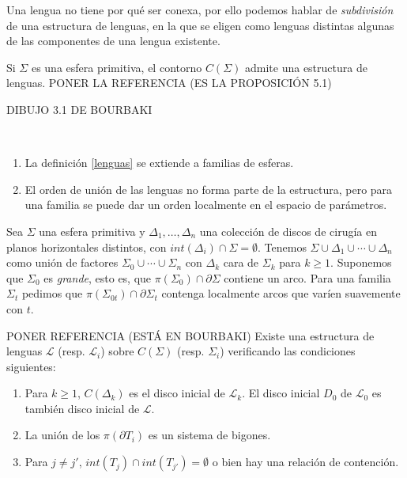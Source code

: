 \documentclass[twoside, 11pt]{article}
\begin{document}
Una lengua no tiene por qué ser conexa, por ello podemos hablar de \emph{subdivisión} de una estructura de lenguas, en la que se eligen como lenguas distintas algunas de las componentes de una lengua existente. 

\begin{teorema}
Si $\Sigma$ es una esfera primitiva, el contorno $C(\Sigma)$ admite una estructura de lenguas. PONER LA REFERENCIA (ES LA PROPOSICIÓN 5.1)
\end{teorema}

DIBUJO 3.1 DE BOURBAKI

\begin{nota}\
\begin{enumerate}
\item La definición \ref{lenguas} se extiende a familias de esferas.
\item El orden de unión de las lenguas no forma parte de la estructura, pero para una familia se puede dar un orden localmente en el espacio de parámetros.  
\end{enumerate}
\end{nota}

Sea $\Sigma$ una esfera primitiva y $\Delta_1,\dots, \Delta_n$ una colección de discos de cirugía en planos horizontales distintos, con $int(\Delta_i)\cap\Sigma=\emptyset$. Tenemos $\Sigma\cup\Delta_1\cup\cdots\cup\Delta_n$ como unión de factores $\Sigma_0\cup\cdots\cup \Sigma_n$ con $\Delta_k$ cara de $\Sigma_k$ para $k\geq 1$. Suponemos que $\Sigma_0$ es \emph{grande}, esto es, que $\pi(\Sigma_0)\cap\partial\Sigma$ contiene un arco. Para una familia $\Sigma_t$ pedimos que $\pi(\Sigma_{0t})\cap\partial\Sigma_t$ contenga localmente arcos que varíen suavemente con $t$.

\begin{teorema}[de compatibilidad]PONER REFERENCIA (ESTÁ EN BOURBAKI) 
Existe una estructura de lenguas $\mathcal{L}$ (resp. $\mathcal{L}_i$) sobre $C(\Sigma)$ (resp. $\Sigma_i$) verificando las condiciones siguientes:
\begin{enumerate}
\item Para $k\geq 1$, $C(\Delta_k)$ es el disco inicial de $\mathcal{L}_k$. El disco inicial $D_0$ de $\mathcal{L}_0$ es también disco inicial de $\mathcal{L}$.
\item La unión de los $\pi(\partial T_i)$ es un sistema de bigones.
\item Para $j\neq j'$, $int(T_j)\cap int(T_{j'})=\emptyset$ o bien hay una relación de contención. 
\end{enumerate}
\end{teorema}
\end{document}
